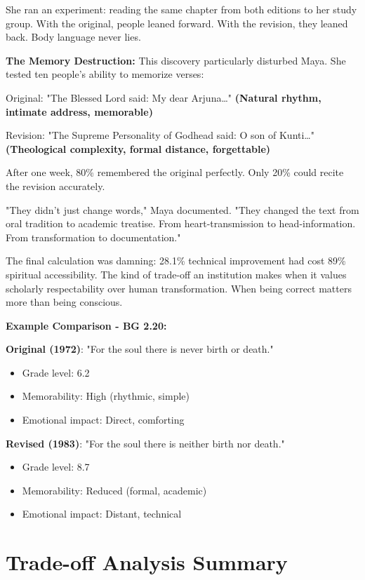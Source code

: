 \documentclass[11pt,twoside]{book}
\begin{document}
She ran an experiment: reading the same chapter from both editions to her study group. With the original, people leaned forward. With the revision, they leaned back. Body language never lies.

\textbf{\textbf{The Memory Destruction:}}
This discovery particularly disturbed Maya. She tested ten people's ability to memorize verses:

Original: "The Blessed Lord said: My dear Arjuna\ldots{}"
\textbf{(Natural rhythm, intimate address, memorable)}

Revision: "The Supreme Personality of Godhead said: O son of Kunti\ldots{}"
\textbf{(Theological complexity, formal distance, forgettable)}

After one week, 80\% remembered the original perfectly. Only 20\% could recite the revision accurately.

"They didn't just change words," Maya documented. "They changed the text from oral tradition to academic treatise. From heart-transmission to head-information. From transformation to documentation."

The final calculation was damning: 28.1\% technical improvement had cost 89\% spiritual accessibility. The kind of trade-off an institution makes when it values scholarly respectability over human transformation. When being correct matters more than being conscious.

\textbf{\textbf{Example Comparison - BG 2.20:}}

\textbf{\textbf{Original (1972)}}: "For the soul there is never birth or death."
\begin{itemize}
\item Grade level: 6.2
\item Memorability: High (rhythmic, simple)
\item Emotional impact: Direct, comforting
\end{itemize}

\textbf{\textbf{Revised (1983)}}: "For the soul there is neither birth nor death."
\begin{itemize}
\item Grade level: 8.7
\item Memorability: Reduced (formal, academic)
\item Emotional impact: Distant, technical
\end{itemize}
\section*{Trade-off Analysis Summary}
\label{sec:org8a6f9e4}
\end{document}
